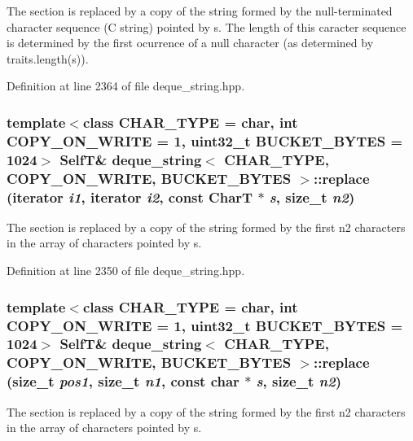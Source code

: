 The section is replaced by a copy of the string formed by the null-terminated character sequence (C string) pointed by s. The length of this caracter sequence is determined by the first ocurrence of a null character (as determined by traits.length(s)). 

Definition at line 2364 of file deque\_\-string.hpp.\hypertarget{classdeque__string_c69d24bbf034ed9ed36b29ced416eea4}{
\subsubsection[{replace}]{\setlength{\rightskip}{0pt plus 5cm}template$<$class CHAR\_\-TYPE  = char, int COPY\_\-ON\_\-WRITE = 1, uint32\_\-t BUCKET\_\-BYTES = 1024$>$ {\bf SelfT}\& {\bf deque\_\-string}$<$ CHAR\_\-TYPE, COPY\_\-ON\_\-WRITE, BUCKET\_\-BYTES $>$::replace (iterator {\em i1}, \/  iterator {\em i2}, \/  const CharT $\ast$ {\em s}, \/  size\_\-t {\em n2})}}
\label{classdeque__string_c69d24bbf034ed9ed36b29ced416eea4}


The section is replaced by a copy of the string formed by the first n2 characters in the array of characters pointed by s. 

Definition at line 2350 of file deque\_\-string.hpp.\hypertarget{classdeque__string_2d20e57466d40ab0b5605ca7c296c99f}{
\subsubsection[{replace}]{\setlength{\rightskip}{0pt plus 5cm}template$<$class CHAR\_\-TYPE  = char, int COPY\_\-ON\_\-WRITE = 1, uint32\_\-t BUCKET\_\-BYTES = 1024$>$ {\bf SelfT}\& {\bf deque\_\-string}$<$ CHAR\_\-TYPE, COPY\_\-ON\_\-WRITE, BUCKET\_\-BYTES $>$::replace (size\_\-t {\em pos1}, \/  size\_\-t {\em n1}, \/  const char $\ast$ {\em s}, \/  size\_\-t {\em n2})}}
\label{classdeque__string_2d20e57466d40ab0b5605ca7c296c99f}


The section is replaced by a copy of the string formed by the first n2 characters in the array of characters pointed by s. 


